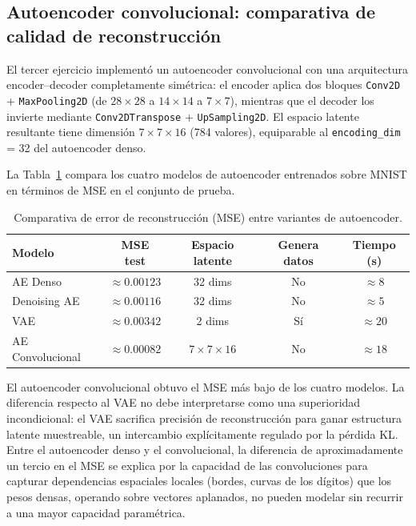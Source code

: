 \documentclass[12pt, a4paper]{article}
\begin{document}
\subsection{Autoencoder convolucional: comparativa de calidad de reconstrucción}

El tercer ejercicio implementó un autoencoder convolucional con una arquitectura encoder--decoder completamente simétrica: el encoder aplica dos bloques \texttt{Conv2D} + \texttt{MaxPooling2D} (de $28 \times 28$ a $14 \times 14$ a $7 \times 7$), mientras que el decoder los invierte mediante \texttt{Conv2DTranspose} + \texttt{UpSampling2D}. El espacio latente resultante tiene dimensión $7 \times 7 \times 16$ (784 valores), equiparable al \texttt{encoding\_dim} = 32 del autoencoder denso.

La Tabla~\ref{tab:ae} compara los cuatro modelos de autoencoder entrenados sobre MNIST en términos de MSE en el conjunto de prueba.

\begin{table}[h!]
  \centering
  \caption{Comparativa de error de reconstrucción (MSE) entre variantes de autoencoder.}
  \label{tab:ae}
  \begin{tabular}{lcccc}
    \toprule
    \textbf{Modelo} & \textbf{MSE test} & \textbf{Espacio latente} & \textbf{Genera datos} & \textbf{Tiempo (s)} \\
    \midrule
    AE Denso        & $\approx 0.00123$ & 32 dims   & No  & $\approx 8$  \\
    Denoising AE    & $\approx 0.00116$ & 32 dims   & No  & $\approx 5$  \\
    VAE             & $\approx 0.00342$ & 2 dims    & Sí  & $\approx 20$ \\
    AE Convolucional & $\approx 0.00082$ & $7\times7\times16$ & No & $\approx 18$ \\
    \bottomrule
  \end{tabular}
\end{table}

El autoencoder convolucional obtuvo el MSE más bajo de los cuatro modelos. La diferencia respecto al VAE no debe interpretarse como una superioridad incondicional: el VAE sacrifica precisión de reconstrucción para ganar estructura latente muestreable, un intercambio explícitamente regulado por la pérdida KL. Entre el autoencoder denso y el convolucional, la diferencia de aproximadamente un tercio en el MSE se explica por la capacidad de las convoluciones para capturar dependencias espaciales locales (bordes, curvas de los dígitos) que los pesos densas, operando sobre vectores aplanados, no pueden modelar sin recurrir a una mayor capacidad paramétrica.
\end{document}
